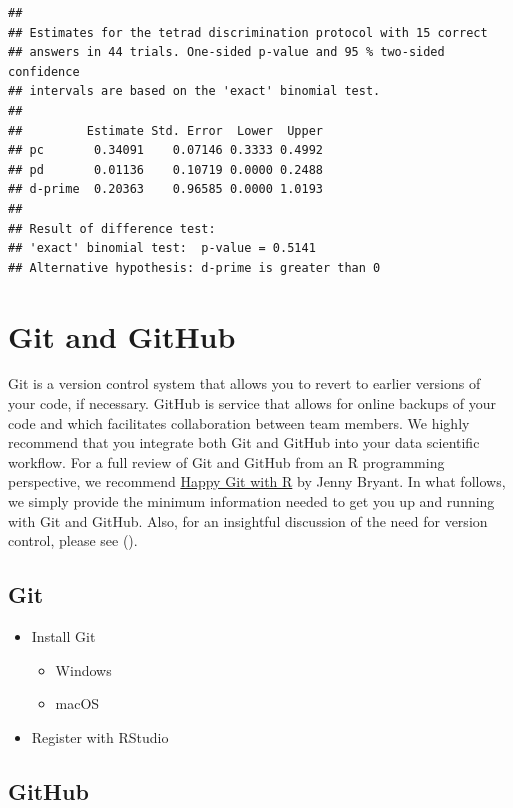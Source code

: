 \documentclass[
]{book}
\providecommand{\tightlist}{%
  \setlength{\itemsep}{0pt}\setlength{\parskip}{0pt}}
\begin{document}
\begin{verbatim}
## 
## Estimates for the tetrad discrimination protocol with 15 correct
## answers in 44 trials. One-sided p-value and 95 % two-sided confidence
## intervals are based on the 'exact' binomial test. 
## 
##         Estimate Std. Error  Lower  Upper
## pc       0.34091    0.07146 0.3333 0.4992
## pd       0.01136    0.10719 0.0000 0.2488
## d-prime  0.20363    0.96585 0.0000 1.0193
## 
## Result of difference test:
## 'exact' binomial test:  p-value = 0.5141 
## Alternative hypothesis: d-prime is greater than 0
\end{verbatim}

\hypertarget{git-and-github}{%
\section{Git and GitHub}\label{git-and-github}}

Git is a version control system that allows you to revert to earlier versions of your code, if necessary. GitHub is service that allows for online backups of your code and which facilitates collaboration between team members. We highly recommend that you integrate both Git and GitHub into your data scientific workflow. For a full review of Git and GitHub from an R programming perspective, we recommend \href{https://happygitwithr.com/}{Happy Git with R} by Jenny Bryant. In what follows, we simply provide the minimum information needed to get you up and running with Git and GitHub. Also, for an insightful discussion of the need for version control, please see (\citet{bryan2018excuse}).

\hypertarget{git}{%
\subsection{Git}\label{git}}

\begin{itemize}
\tightlist
\item
  Install Git

  \begin{itemize}
  \tightlist
  \item
    Windows
  \item
    macOS
  \end{itemize}
\item
  Register with RStudio
\end{itemize}

\hypertarget{github-1}{%
\subsection{GitHub}\label{github-1}}
\end{document}
